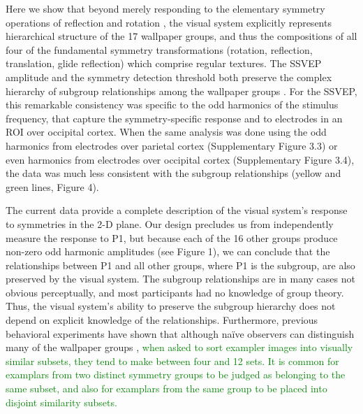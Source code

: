 \documentclass[9pt,twocolumn,twoside,lineno]{pnas-new}
\begin{document}
Here we show that beyond merely responding to the elementary symmetry operations of reflection \cite{RN1170} and rotation \cite{RN1725}, the visual system explicitly represents hierarchical structure of the 17 wallpaper groups, and thus the compositions of all four of the fundamental symmetry transformations (rotation, reflection, translation, glide reflection) which comprise regular textures. The SSVEP amplitude and the symmetry detection threshold both preserve the complex hierarchy of subgroup relationships among the wallpaper groups \cite{RN1711}. For the SSVEP, this remarkable consistency was specific to the odd harmonics of the stimulus frequency, that capture the symmetry-specific response \cite{RN1725} and to electrodes in an ROI over occipital cortex. When the same analysis was done using the odd harmonics from electrodes over parietal cortex (Supplementary Figure 3.3) or even harmonics from electrodes over occipital cortex (Supplementary Figure 3.4), the data was much less consistent with the subgroup relationships (yellow and green lines, Figure 4). 

The current data provide a complete description of the visual system’s response to symmetries in the 2-D plane. Our design precludes us from independently measure the response to P1, but because each of the 16 other groups produce non-zero odd harmonic amplitudes (see Figure 1), we can conclude that the relationships between P1 and all other groups, where P1 is the subgroup, are also preserved by the visual system. The subgroup relationships are in many cases not obvious perceptually, and most participants had no knowledge of group theory. Thus, the visual system’s ability to preserve the subgroup hierarchy does not depend on explicit knowledge of the relationships. Furthermore, previous behavioral experiments have shown that although naïve observers can distinguish many of the wallpaper groups \cite{RN1253}, \textcolor{green}{when asked to sort exampler images into visually similar subsets, they tend to make between four and 12 sets. It is common for examplars from two distinct symmetry groups to be judged as belonging to the same subset, and also for examplars from the same group to be placed into disjoint similarity subsets.}
\end{document}
